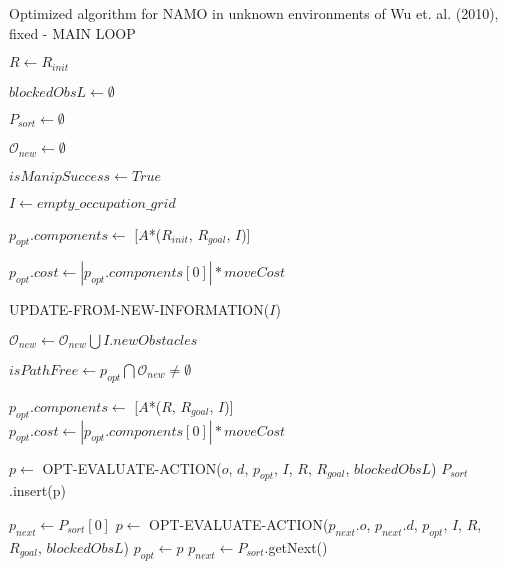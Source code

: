 \begin{algorithm}[H]

  \caption{Optimized algorithm for NAMO in unknown environments of Wu et. al. (2010), fixed - MAIN LOOP}

  \label{alg:01-wu-optimized-part1}

  \begin{algorithmic}[1]


        \State $R \gets R_{init}$

        \State $blockedObsL \gets \emptyset$

        \State $P_{sort} \gets \emptyset$

        \State $\mathcal{O}_{new} \gets \emptyset$

        \State $isManipSuccess \gets True$

        \State $I \gets empty\_occupation\_grid$

        \State $p_{opt}.components \gets$ [$A$*($R_{init}$, $R_{goal}$, $I$)]

        \State $p_{opt}.cost \gets |p_{opt}.components[0]| * moveCost$


          \State UPDATE-FROM-NEW-INFORMATION($I$) 

          \State $\mathcal{O}_{new} \gets \mathcal{O}_{new} \bigcup I.newObstacles$

          \State $isPathFree \gets p_{opt} \bigcap \mathcal{O}_{new} \neq \emptyset$ 


            \State $p_{opt}.components \gets$ [$A$*($R$, $R_{goal}$, $I$)]
            \State $p_{opt}.cost \gets |p_{opt}.components[0]| * moveCost$

                \State $p \gets$ OPT-EVALUATE-ACTION($o$, $d$, $p_{opt}$, $I$, $R$, $R_{goal}$, $blockedObsL$)
                  \State $P_{sort}$.insert(p)
                \EndIf
              \EndFor
            \EndFor

              \State $p_{next} \gets P_{sort}[0]$
               
                \State $p \gets$ OPT-EVALUATE-ACTION($p_{next}.o$, $p_{next}.d$, $p_{opt}$, $I$, $R$, $R_{goal}$, $blockedObsL$) \label{lst:line:suppcondition}
                  \State $p_{opt} \gets p$
                \EndIf
                \State $p_{next} \gets P_{sort}$.getNext() 
              \EndWhile
            \EndIf


\end{algorithmic}
\end{algorithm}
